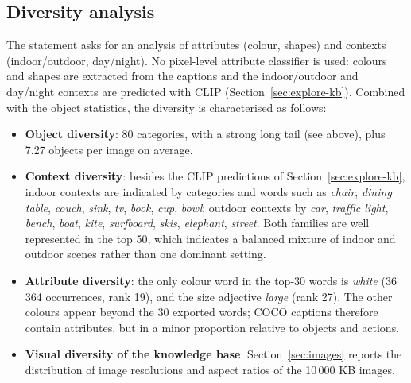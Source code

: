 \documentclass[11pt,a4paper]{article}
\renewcommand{\_}{\textunderscore\allowbreak{}}
\begin{document}
\subsection{Diversity analysis}

The statement asks for an analysis of attributes (colour, shapes) and contexts (indoor/outdoor, day/night). No pixel-level attribute classifier is used: colours and shapes are extracted from the captions and the indoor/outdoor and day/night contexts are predicted with CLIP (Section~\ref{sec:explore-kb}). Combined with the object statistics, the diversity is characterised as follows:
\begin{itemize}[nosep]
  \item \textbf{Object diversity}: 80 categories, with a strong long tail (see above), plus 7.27 objects per image on average.
  \item \textbf{Context diversity}: besides the CLIP predictions of Section~\ref{sec:explore-kb}, indoor contexts are indicated by categories and words such as \emph{chair}, \emph{dining table}, \emph{couch}, \emph{sink}, \emph{tv}, \emph{book}, \emph{cup}, \emph{bowl}; outdoor contexts by \emph{car}, \emph{traffic light}, \emph{bench}, \emph{boat}, \emph{kite}, \emph{surfboard}, \emph{skis}, \emph{elephant}, \emph{street}. Both families are well represented in the top 50, which indicates a balanced mixture of indoor and outdoor scenes rather than one dominant setting.
  \item \textbf{Attribute diversity}: the only colour word in the top-30 words is \emph{white} (36\,364 occurrences, rank 19), and the size adjective \emph{large} (rank 27). The other colours appear beyond the 30 exported words; COCO captions therefore contain attributes, but in a minor proportion relative to objects and actions.
  \item \textbf{Visual diversity of the knowledge base}: Section~\ref{sec:images} reports the distribution of image resolutions and aspect ratios of the 10\,000 KB images.
\end{itemize}
\end{document}
